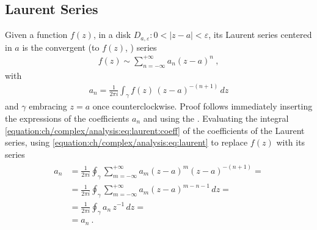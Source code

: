 \documentclass[letterpaper,10pt,english]{jupyterBook}
\begin{document}
\subsection{Laurent Series}
\label{\detokenize{ch/complex/analysis:laurent-series}}\label{\detokenize{ch/complex/analysis:complex-analysis-mero-fun-laurent}}
\sphinxAtStartPar
Given a function \(f(z)\), in a disk \(D_{a,\varepsilon}: 0 < |z-a| < \varepsilon\), its Laurent series centered in \(a\) is the convergent (to \(f(z)\),  ) series
\begin{equation}\label{equation:ch/complex/analysis:eq:laurent}
\begin{split}f(z) \sim \sum_{n=-\infty}^{+\infty} a_n (z-a)^n \ ,\end{split}
\end{equation}
\sphinxAtStartPar
with
\begin{equation}\label{equation:ch/complex/analysis:eq:laurent:coeff}
\begin{split}a_n = \frac{1}{2 \pi i}\int_{\gamma} f(z) \, (z-a)^{-(n+1)} \, dz\end{split}
\end{equation}
\sphinxAtStartPar
and \(\gamma\) embracing \(z = a\) once counter\sphinxhyphen{}clockwise. Proof follows immediately inserting the expressions of the coefficients \(a_n\) and using the {\hyperref[\detokenize{ch/complex/analysis:complex-analysis-useful-int-path-independence-z-n}]{}}. Evaluating the integral \eqref{equation:ch/complex/analysis:eq:laurent:coeff} of the coefficients of the Laurent series, using \eqref{equation:ch/complex/analysis:eq:laurent} to replace \(f(z)\) with its series
\begin{equation*}
\begin{split}\begin{aligned}
  a_n & = \frac{1}{2 \pi i}\oint_{\gamma} \sum_{m=-\infty}^{+\infty} a_m (z-a)^m (z-a)^{-(n+1)} = \\
  & = \frac{1}{2 \pi i} \oint_{\gamma} \sum_{m=-\infty}^{+\infty} a_m (z-a)^{m - n - 1}  \, dz = \\
  & = \frac{1}{2 \pi i} \oint_{\gamma} a_n \, z^{-1} \, dz = \\
  & = a_n \ . 
\end{aligned}\end{split}
\end{equation*}
\sphinxAtStartPar
{} 
\end{document}
